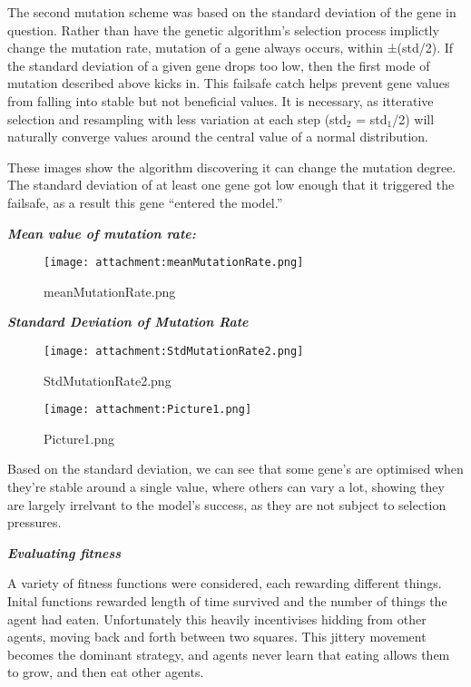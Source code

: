 \documentclass[
]{article}
\begin{document}
The second mutation scheme was based on the standard deviation of the
gene in question. Rather than have the genetic algorithm's selection
process implictly change the mutation rate, mutation of a gene always
occurs, within ±(std/2). If the standard deviation of a given gene drops
too low, then the first mode of mutation described above kicks in. This
failsafe catch helps prevent gene values from falling into stable but
not beneficial values. It is necessary, as itterative selection and
resampling with less variation at each step (std\(_2\) = std\(_1\)/2)
will naturally converge values around the central value of a normal
distribution.

These images show the algorithm discovering it can change the mutation
degree. The standard deviation of at least one gene got low enough that
it triggered the failsafe, as a result this gene ``entered the model.''

\textbf{\emph{Mean value of mutation rate:}}

\begin{figure}
\centering
\texttt{[image: attachment:meanMutationRate.png]}
\caption{meanMutationRate.png}
\end{figure}

\textbf{\emph{Standard Deviation of Mutation Rate}}

\begin{figure}
\centering
\texttt{[image: attachment:StdMutationRate2.png]}
\caption{StdMutationRate2.png}
\end{figure}

\begin{figure}
\centering
\texttt{[image: attachment:Picture1.png]}
\caption{Picture1.png}
\end{figure}

Based on the standard deviation, we can see that some gene's are
optimised when they're stable around a single value, where others can
vary a lot, showing they are largely irrelvant to the model's success,
as they are not subject to selection pressures.

\textbf{\emph{Evaluating fitness}}

A variety of fitness functions were considered, each rewarding different
things. Inital functions rewarded length of time survived and the number
of things the agent had eaten. Unfortunately this heavily incentivises
hidding from other agents, moving back and forth between two squares.
This jittery movement becomes the dominant strategy, and agents never
learn that eating allows them to grow, and then eat other agents.
\end{document}
